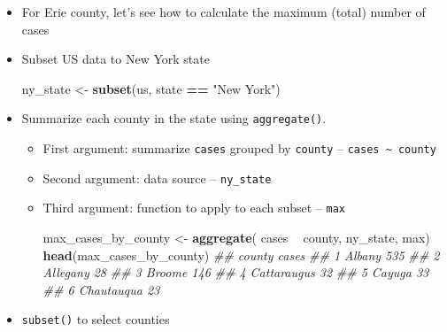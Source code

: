 \documentclass[
]{book}
\newenvironment{Shaded}{\begin{snugshade}}{\end{snugshade}}
\newcommand{\CommentTok}[1]{\textcolor[rgb]{0.56,0.35,0.01}{\textit{#1}}}
\newcommand{\KeywordTok}[1]{\textcolor[rgb]{0.13,0.29,0.53}{\textbf{#1}}}
\newcommand{\NormalTok}[1]{#1}
\newcommand{\OperatorTok}[1]{\textcolor[rgb]{0.81,0.36,0.00}{\textbf{#1}}}
\newcommand{\StringTok}[1]{\textcolor[rgb]{0.31,0.60,0.02}{#1}}
\begin{document}
\begin{itemize}
\item
  For Erie county, let's see how to calculate the maximum (total) number of cases

\begin{Shaded}
\end{Shaded}
\item
  Subset US data to New York state

\begin{Shaded}
\begin{Highlighting}[]
\NormalTok{ny_state <-}\StringTok{ }\KeywordTok{subset}\NormalTok{(us, state }\OperatorTok{==}\StringTok{ "New York"}\NormalTok{)}
\end{Highlighting}
\end{Shaded}
\item
  Summarize each county in the state using \texttt{aggregate()}.

  \begin{itemize}
  \item
    First argument: summarize \texttt{cases} grouped by \texttt{county} -- \texttt{cases\ \textasciitilde{}\ county}
  \item
    Second argument: data source -- \texttt{ny\_state}
  \item
    Third argument: function to apply to each subset -- \texttt{max}

\begin{Shaded}
\begin{Highlighting}[]
\NormalTok{max_cases_by_county <-}\StringTok{ }\KeywordTok{aggregate}\NormalTok{( cases }\OperatorTok{~}\StringTok{ }\NormalTok{county, ny_state, max)}
\KeywordTok{head}\NormalTok{(max_cases_by_county)}
\CommentTok{##        county cases}
\CommentTok{## 1      Albany   535}
\CommentTok{## 2    Allegany    28}
\CommentTok{## 3      Broome   146}
\CommentTok{## 4 Cattaraugus    32}
\CommentTok{## 5      Cayuga    33}
\CommentTok{## 6  Chautauqua    23}
\end{Highlighting}
\end{Shaded}
  \end{itemize}
\item
  \texttt{subset()} to select counties


\end{itemize}
\end{document}
